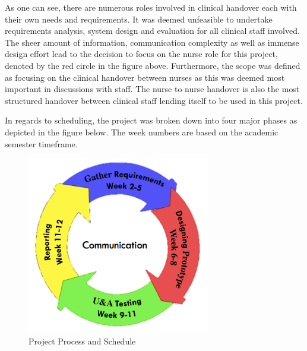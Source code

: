 \noindent As one can see, there are numerous roles involved in clinical handover each with their own needs and requirements. It was deemed unfeasible to undertake requirements analysis, system design and evaluation for all clinical staff involved. The sheer amount of information, communication complexity as well as immense design effort lead to the decision to focus on the nurse role for this project, denoted by the red circle in the figure above. Furthermore, the scope was defined as focusing on the clinical handover between nurses as this was deemed most important in discussions with staff. The nurse to nurse handover is also the most structured handover between clinical staff lending itself to be used in this project. 

\newpage 
\noindent In regards to scheduling, the project was broken down into four major phases as depicted in the figure below. The week numbers are based on the academic semester timeframe.

\begin{figure}[hp]
				\centering
				\includegraphics[scale=1.0, width=80mm]{Images/Project_Process}
				\caption{Project Process and Schedule}
\end{figure} 

